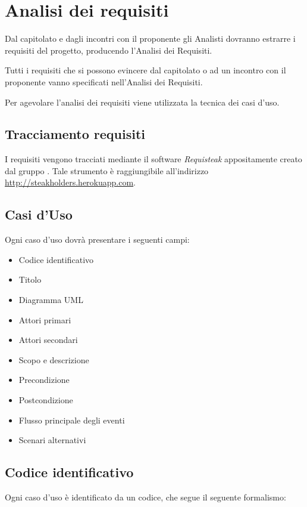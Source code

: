 \section{Analisi dei requisiti}

Dal capitolato e dagli incontri con il proponente gli Analisti dovranno estrarre i requisiti del progetto, producendo l'Analisi dei Requisiti.

Tutti i requisiti che si possono evincere dal capitolato o ad un incontro con il proponente vanno specificati nell'Analisi dei Requisiti.

Per agevolare l'analisi dei requisiti viene utilizzata la tecnica dei casi d'uso.

	\subsection{Tracciamento requisiti}
	 I requisiti vengono tracciati mediante il software \emph{Requisteak} appositamente creato dal gruppo \GroupName{}. Tale strumento è raggiungibile all'indirizzo \url{http://steakholders.herokuapp.com}.
	 
\subsection{Casi d'Uso}

Ogni caso d'uso dovrà presentare i seguenti campi:
\begin{itemize}
 \item Codice identificativo
 \item Titolo
 \item Diagramma UML
 \item Attori primari
 \item Attori secondari 
 \item Scopo e descrizione
 \item Precondizione
 \item Postcondizione
 \item Flusso principale degli eventi
 \item Scenari alternativi
\end{itemize}

\subsection{Codice identificativo}

Ogni caso d'uso è identificato da un codice, che segue il seguente formalismo:
\begin{center}
\end{center}

